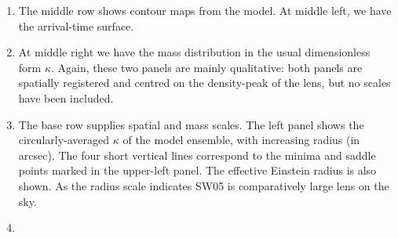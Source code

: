 \begin{enumerate}
\item The middle row shows contour maps from the model.  At middle
  left, we have the arrival-time surface.
\item At middle right we have the mass distribution in the usual
  dimensionless form $\kappa$.  Again, these two panels are mainly
  qualitative: both panels are spatially registered and centred on the
  density-peak of the lens, but no scales have been included.
\item The base row supplies spatial and mass scales.  The left panel
  shows the circularly-averaged $\kappa$ of the model ensemble, with
  increasing radius (in arcsec).  The four short vertical lines
  correspond to the minima and saddle points marked in the upper-left
  panel.  The effective Einstein radius \ER is also shown.  As the radius
  scale indicates SW05 is comparatively large lens on the
  sky.
\item 
\end{enumerate}

